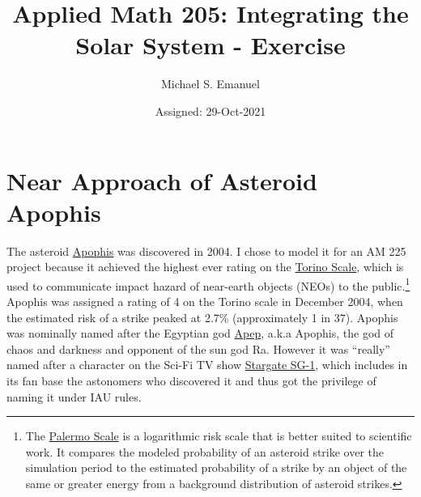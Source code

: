 \documentclass{article}
\title{Applied Math 205: Integrating the Solar System - Exercise}
\author{Michael S. Emanuel}
\date{Assigned: 29-Oct-2021}
\begin{document}
\maketitle

\noindent
\section*{Near Approach of Asteroid Apophis}

The asteroid \href{https://en.wikipedia.org/wiki/99942_Apophis}{Apophis} was discovered in 2004.  
I chose to model it for an AM 225 project because it achieved the highest ever rating 
on the \href{https://en.wikipedia.org/wiki/Torino_scale}{Torino Scale}, which is used
to communicate impact hazard of near-earth objects (NEOs) to the public.\footnote{
The \href{https://en.wikipedia.org/wiki/Palermo_Technical_Impact_Hazard_Scale}{Palermo Scale}
is a logarithmic risk scale that is better suited to scientific work.  
It compares the modeled probability of an asteroid strike over the simulation period to the 
estimated probability of a strike by an object of the same or greater energy from a background
distribution of asteroid strikes.}
Apophis was assigned a rating of 4 on the Torino scale in December 2004,
when the estimated risk of a strike peaked at 2.7\% (approximately 1 in 37).
Apophis was nominally named after the Egyptian god 
\href{https://en.wikipedia.org/wiki/Apep}{Apep}, a.k.a Apophis, 
the god of chaos and darkness and opponent of the sun god Ra.
However it was ``really'' named after a character on the Sci-Fi TV show 
\href{https://en.wikipedia.org/wiki/Stargate_SG-1}{Stargate SG-1}, 
which includes in its fan base the astonomers who discovered it
and thus got the privilege of naming it under IAU rules.
\end{document}
